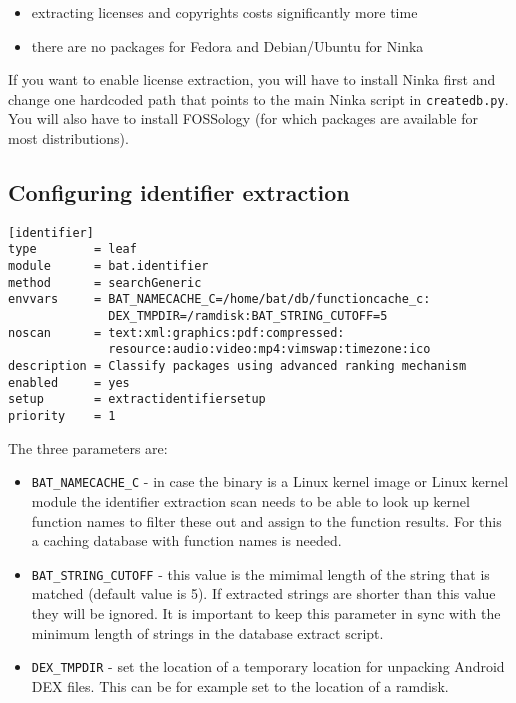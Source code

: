 \documentclass[10pt]{article}
\begin{document}
\begin{itemize}
\item extracting licenses and copyrights costs significantly more time
\item there are no packages for Fedora and Debian/Ubuntu for Ninka
\end{itemize}

If you want to enable license extraction, you will have to install Ninka first
and change one hardcoded path that points to the main Ninka script in
\texttt{createdb.py}. You will also have to install FOSSology
(for which packages are available for most distributions).

\subsection{Configuring identifier extraction}

\begin{verbatim}
[identifier]
type        = leaf
module      = bat.identifier
method      = searchGeneric
envvars     = BAT_NAMECACHE_C=/home/bat/db/functioncache_c:
              DEX_TMPDIR=/ramdisk:BAT_STRING_CUTOFF=5
noscan      = text:xml:graphics:pdf:compressed:
              resource:audio:video:mp4:vimswap:timezone:ico
description = Classify packages using advanced ranking mechanism
enabled     = yes
setup       = extractidentifiersetup
priority    = 1
\end{verbatim}

The three parameters are:

\begin{itemize}
\item \texttt{BAT\_NAMECACHE\_C} - in case the binary is a Linux kernel image
or Linux kernel module the identifier extraction scan needs to be able to look
up kernel function names to filter these out and assign to the function
results. For this a caching database with function names is needed.
\item \texttt{BAT\_STRING\_CUTOFF} - this value is the mimimal length of the
string that is matched (default value is 5). If extracted strings are shorter
than this value they will be ignored. It is important to keep this parameter in
sync with the minimum length of strings in the database extract script.
\item \texttt{DEX\_TMPDIR} - set the location of a temporary location for
unpacking Android DEX files. This can be for example set to the location of a
ramdisk.
\end{itemize}
\end{document}
